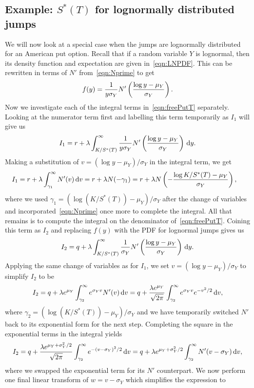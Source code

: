 		\subsection{Example: $S^*(T)$ for lognormally distributed jumps}
		We will now look at a special case when the jumps are lognormally distributed for an American put option. Recall that if a random variable $Y$ is lognormal, then its density function and expectation are given in~\eqref{eqn:LNPDF}. This can be rewritten in terms of $N'$ from~\eqref{eqn:Nprime} to get
		$$
			f(y) = \frac{1}{y\sigma_Y}N'\left( \frac{\log y - \mu_Y}{\sigma_Y} \right).
		$$
Now we investigate each of the integral terms in~\eqref{eqn:freePutT} separately. Looking at the numerator term first and labelling this term temporarily as $I_1$ will give us
		$$
			I_1 = r + \lambda\int_{K/S^*(T)}^\infty \frac{1}{y\sigma_Y}N'\left( \frac{\log y - \mu_Y}{\sigma_Y} \right) \, \mathrm d y.
		$$
Making a substitution of $v = (\log y - \mu_Y)/\sigma_Y$ in the integral term, we get
		\begin{align*}
			I_1 &= r + \lambda\int_{\gamma_1}^\infty N'(v) \, \mathrm d v = r + \lambda N(-\gamma_1) = r + \lambda N \left( - \frac{\log K/S^*(T) - \mu_Y}{\sigma_Y}  \right),
		\end{align*}
where we used $\gamma_1 = (\log (K/S^*(T)) - \mu_Y)/\sigma_Y$ after the change of variables and incorporated~\eqref{eqn:Nprime} once more to complete the integral. All that remains is to compute the integral on the denominator of~\eqref{eqn:freePutT}. Coining this term as $I_2$ and replacing $f(y)$ with the PDF for lognormal jumps gives us
	$$
		I_2 =  q + \lambda\int_{K/S^*(T)}^\infty \frac{1}{\sigma_Y}N'\left( \frac{\log y - \mu_Y}{\sigma_Y} \right) \, \mathrm d y.
	$$
Applying the same change of variables as for $I_1$, we set $v = (\log y - \mu_Y)/\sigma_Y$ to simplify $I_2$ to be
	$$
		I_2 = q + \lambda e^{\mu_Y}\int_{\gamma_2}^\infty e^{\sigma_Yv}N'(v) \, \mathrm d v =  q + \frac{\lambda e^{\mu_Y}}{\sqrt{2\pi}}\int_{\gamma_2}^\infty e^{\sigma_Yv}e^{-v^2/2} \, \mathrm d v,
	$$
where $\gamma_2 = (\log (K/S^*(T)) - \mu_Y)/\sigma_Y$ and we have temporarily switched $N'$ back to its exponential form for the next step. Completing the square in the exponential terms in the integral yields
	$$
		I_2 = q + \frac{\lambda e^{\mu_Y+\sigma_Y^2/2}}{\sqrt{2\pi}}\int_{\gamma_2}^\infty e^{-(v-\sigma_Y)^2/2} \, \mathrm d v = q + \lambda e^{\mu_Y+\sigma_Y^2/2}\int_{\gamma_2}^\infty N'(v-\sigma_Y) \, \mathrm d v,
	$$
where we swapped the exponential term for its $N'$ counterpart. We now perform one final linear transform of $w = v - \sigma_Y$ which simplifies the expression to
